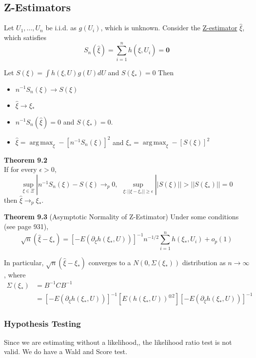 \documentclass[12pt]{article}
\newcommand{\sumn}{\sum_{i=1}^n}
\DeclareMathOperator*{\argmax}{arg\,max}
\numberwithin{equation}{section}
\begin{document}
\subsection{Z-Estimators}
Let $U_1, \ldots, U_n$ be i.i.d. as $g(U_i)$, which is unknown. Consider the \underline{Z-estimator} $\hat{\xi}$, which satisfies
\begin{equation*}
  S_n(\hat{\xi}) = \sumn h(\hat{\xi}, U_i) = \mathbf{0}
\end{equation*}

Let $S(\xi) = \int h(\xi, U) g(U) dU$ and $S(\xi_*) = 0$ Then
\begin{itemize}
  \item $n^{-1} S_n(\xi) \to S(\xi)$ 
  \item $\hat{\xi} \to \xi_*$ 
  \item $n^{-1} S_n(\hat{\xi}) = 0$ and $S(\xi_*) = 0$.
  \item $\hat{\xi} = \argmax_{\xi} -[n^{-1} S_n(\xi)]^{2}$ and
        $\xi_* = \argmax_{\xi} -[S(\xi)]^{2}$
\end{itemize}

\textbf{Theorem 9.2} \\
If for every $\epsilon > 0$, 
\begin{equation*}
  \sup_{\xi \in \Xi} |n^{-1} S_n(\xi) - S(\xi) \to_p 0, \ \ 
  \sup_{\xi : ||\xi - \xi_* || \ge \epsilon} ||S(\xi)|| > ||S(\xi_*)|| = 0
\end{equation*}
then $\hat{\xi} \to_p \xi_*$.

\textbf{Theorem 9.3} (Asymptotic Normality of Z-Estimator)
Under some conditions (see page 931),
\begin{equation*}
  \sqrt{n}(\hat{\xi} - \xi_*) =
    [-E(\partial_{\xi} h(\xi_*, U))]^{-1} n^{-1/2} \sumn h(\xi_*, U_i) + o_p(1)
\end{equation*}

In particular, $\sqrt{n}(\hat{\xi} - \xi_*)$ converges to a 
$N(0, \Sigma(\xi_*))$ distribution as $n \to \infty$, where
\begin{align*}
  \Sigma(\xi_*) &= B^{-1} C B^{-1} \\
    &= [-E(\partial_\xi h(\xi_*, U))]^{-1}
      [E(h(\xi_*, U))^{\otimes 2}] 
      [-E(\partial_\xi h(\xi_*, U))]^{-1}
\end{align*}

\subsubsection{Hypothesis Testing} 
Since we are estimating without a likelihood,, the likelihood ratio test is not valid. We do have a Wald and Score test.
\end{document}

